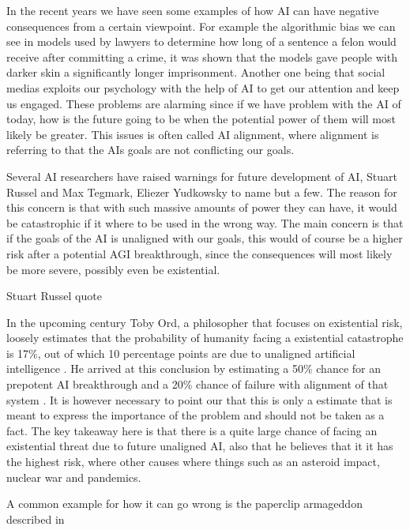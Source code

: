 \documentclass[12pt,A4]{report}
\theoremstyle{definition}
\begin{document}
In the recent years we have seen some examples of how AI can have negative consequences from a certain viewpoint. For example the algorithmic bias we can see in models used by lawyers to determine how long of a sentence a felon would receive after committing a crime, it was shown that the models gave people with darker skin a significantly longer imprisonment. Another one being that social medias exploits our psychology with the help of AI to get our attention and keep us engaged. These problems are alarming since if we have problem with the AI of today, how is the future going to be when the potential power of them will most likely be greater. This issues is often called AI alignment, where alignment is referring to that the AIs goals are not conflicting our goals. 

Several AI researchers have raised warnings for future development of AI, Stuart Russel and Max Tegmark, Eliezer Yudkowsky to name but a few. The reason for this concern is that with such massive amounts of power they can have, it would be catastrophic if it where to be used in the wrong way. The main concern is that if the goals of the AI is unaligned with our goals, this would of course be a higher risk after a potential AGI breakthrough, since the consequences will most likely be more severe, possibly even be existential. 

Stuart Russel quote 

In the upcoming century Toby Ord, a philosopher that focuses on existential risk, loosely estimates that the probability of humanity facing a existential catastrophe is 17\%, out of which 10 percentage points are due to unaligned artificial intelligence \autocite{precipice}. He arrived at this conclusion by estimating a 50\% chance for an prepotent AI breakthrough and a 20\% chance of failure with alignment of that system \autocite{rationally speaking}. It is however necessary to point our that this is only a estimate that is meant to express the importance of the problem and should not be taken as a fact. The key takeaway here is that there is a quite large chance of facing an existential threat due to future unaligned AI, also that he believes that it it has the highest risk, where other causes where things such as an asteroid impact, nuclear war and pandemics. 

A common example for how it can go wrong is the paperclip armageddon described in 
\end{document}

